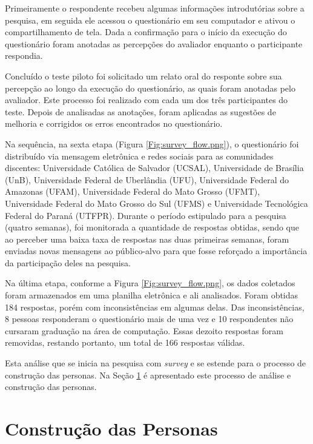 Primeiramente o respondente recebeu algumas informações introdutórias sobre a pesquisa, em seguida ele acessou o questionário em seu computador e ativou o compartilhamento de tela. Dada a confirmação para o início da execução do questionário foram anotadas as percepções do avaliador enquanto o participante respondia.

Concluído o teste piloto foi solicitado um relato oral do responte sobre sua percepção ao longo da execução do questionário, as quais foram anotadas pelo avaliador. Este processo foi realizado com cada um dos três participantes do teste. Depois de analisadas as anotações, foram aplicadas as sugestões de melhoria e corrigidos os erros encontrados no questionário.

Na sequência, na sexta etapa (Figura \ref{Fig:survey_flow.png}), o questionário foi distribuído via mensagem eletrônica e redes sociais para as comunidades discentes: Universidade Católica de Salvador (UCSAL), Universidade de Brasília (UnB), Universidade Federal de Uberlândia (UFU), Universidade Federal do Amazonas (UFAM),  Universidade Federal do Mato Grosso (UFMT), Universidade Federal do Mato Grosso do Sul (UFMS) e Universidade Tecnológica Federal do Paraná (UTFPR). Durante o período estipulado para a pesquisa (quatro semanas), foi monitorada a quantidade de respostas obtidas, sendo que ao perceber uma baixa taxa de respostas nas duas primeiras semanas, foram enviadas novas mensagens ao público-alvo para que fosse reforçado a importância da participação deles na pesquisa.

Na última etapa, conforme a Figura \ref{Fig:survey_flow.png}, os dados coletados foram armazenados em uma planilha eletrônica e ali analisados. Foram obtidas 184 respostas, porém com inconsistências em algumas delas. Das inconsistências, 8 pessoas responderam o questionário mais de uma vez e 10 respondentes não cursaram graduação na área de computação. Essas dezoito respostas foram removidas, restando portanto, um total de 166 respostas válidas. 

Esta análise que se inicia na pesquisa com \textit{survey} e se estende para o processo de construção das personas. Na Seção \ref{sec:const_person} é apresentado este processo de análise e construção das personas.

\section{Construção das Personas}
\label{sec:const_person}

